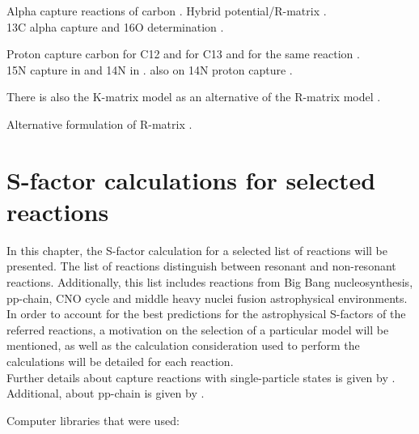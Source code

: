 \documentclass[openany]{book}
\begin{document}
Alpha capture reactions of carbon \cite{schurmann_gialanella_kunz_strieder_2012}.  Hybrid potential/R-matrix \cite{sparenberg_2005}. \\ 13C alpha capture and 16O determination \cite{prusachenko_bobrovsky_bondarenko_bokhovko_gurbich_ketlerov_2022}.

Proton capture carbon \cite{burtebaev_igamov_peterson_yarmukhamedov_zazulin_2008} for C12 and \cite{chakraborty_deboer_mukherjee_roy_2015} for C13 and \cite{genard_descouvemont_terwagne_2010} for the same reaction . \\

15N capture in \cite{barker_2008} and 14N in \cite{angulo_champagne_trautvetter_2005}. also on 14N proton capture \cite{formicola_imbriani_costantini_angulo_bemmerer_bonetti_broggini_corvisiero_cruz_descouvemont_et_2004}.

There is also the K-matrix model as an alternative of the R-matrix model \cite{humblet_1990}.

Alternative formulation of R-matrix \cite{brune_2002}.

\chapter{S-factor calculations for selected reactions} \label{ch:sfactorCalculations}

In this chapter, the S-factor calculation for a selected list of reactions will be presented. The list of reactions distinguish between resonant and non-resonant reactions. Additionally, this list includes reactions from Big Bang nucleosynthesis, pp-chain, CNO cycle and middle heavy nuclei fusion astrophysical environments.  \\

In order to account for the best predictions for the astrophysical S-factors of the referred reactions, a motivation on the selection of a particular model will be mentioned, as well as the calculation consideration used to perform the calculations will be detailed for each reaction. \\


Further details about capture reactions with single-particle states is given by \cite{huang_bertulani_guimaraes_2010}. \\

Additional, about pp-chain is given by \cite{adelberger_garcia_robertson_snover_balantekin_heeger_ramsey-musolf_bemmerer_junghans_bertulani_et_2011}.

Computer libraries that were used:
\end{document}

